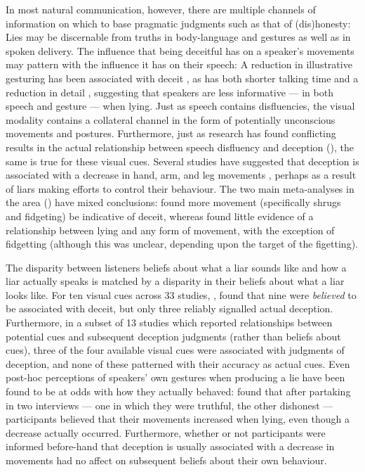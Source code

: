 \documentclass[a4paper,man,natbib]{apa6}
\begin{document}
In most natural communication, however, there are multiple channels of information on which to base pragmatic judgments such as that of (dis)honesty: 
Lies may be discernable from truths in body-language and gestures as well as in spoken delivery.
The influence that being deceitful has on a speaker's movements may pattern with the influence it has on their speech: 
A reduction in illustrative gesturing has been associated with deceit \citep{DePaulo2003, Cohen2010}, as has both shorter talking time and a reduction in detail \citep{DePaulo2003}, suggesting that speakers are less informative --- in both speech and gesture --- when lying. 
Just as speech contains disfluencies, the visual modality contains a collateral channel in the form of potentially unconscious movements and postures.
Furthermore, just as research has found conflicting results in the actual relationship between speech disfluency and deception (\citealt{Zuckerman1981, DePaulo2003}), the same is true for these visual cues. 
Several studies have suggested that deception is associated with a decrease in hand, arm, and leg movements \citep{DePaulo1992, Ekman1989, Vrij1995}, perhaps as a result of liars making efforts to control their behaviour.
The two main meta-analyses in the area (\citealt{Zuckerman1981, DePaulo2003}) have mixed conclusions: \citet{Zuckerman1981} found more movement (specifically shrugs and fidgeting) be indicative of deceit, whereas \citet{DePaulo2003} found little evidence of a relationship between lying and any form of movement, with the exception of fidgetting (although this was unclear, depending upon the target of the figetting).

The disparity between listeners beliefs about what a liar sounds like and how a liar actually speaks is matched by a disparity in their beliefs about what a liar looks like.
For ten visual cues across 33 studies, \citet{Zuckerman1981}, found that nine were \emph{believed} to be associated with deceit, but only three reliably signalled actual deception.
Furthermore, in a subset of 13 studies which reported relationships between potential cues and subsequent deception judgments (rather than beliefs about cues), three of the four available visual cues were associated with judgments of deception, and none of these patterned with their accuracy as actual cues.  
Even post-hoc perceptions of speakers' own gestures when producing a lie have been found to be at odds with how they actually behaved:
\citet{Vrij1996} found that after partaking in two interviews --- one in which they were truthful, the other dishonest --- participants believed that their movements increased when lying, even though a decrease actually occurred.
Furthermore, whether or not participants were informed before-hand that deception is usually associated with a decrease in movements had no affect on subsequent beliefs about their own behaviour.
\end{document}
